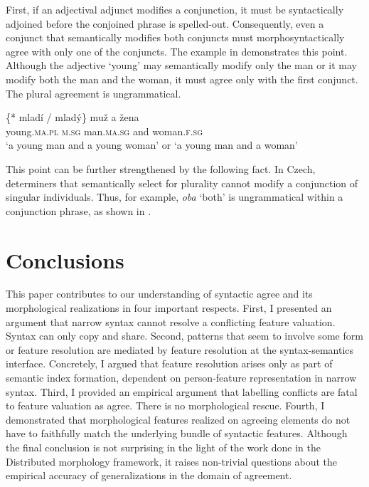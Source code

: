 \documentclass[output=paper,
modfonts
newtxmath,
hidelinks
]{langscibook}
\begin{document}
First, if an adjectival adjunct modifies a conjunction, it must be syntactically adjoined before the conjoined phrase is spelled-out. Consequently, even a conjunct that semantically modifies both conjuncts must morphosyntactically agree with only one of the conjuncts. The example in  demonstrates this point. Although the adjective `young' may semantically modify only the man or it may modify both the man and the woman, it must agree only with the first conjunct. The plural agreement is ungrammatical.


\ea\gll \{*\hspace{-2pt} mladí / mladý\} muž a žena\label{adjunct}\\
{} young.\textsc{ma.pl} {} \textsc{m.sg} man.\textsc{ma.sg} and woman.\textsc{f.sg}\\
\glt `a young man and a young woman' or `a young man and a woman'
\z

\noindent This point can be further strengthened by the following fact. In Czech, determiners that semantically select for plurality cannot modify a conjunction of singular individuals. Thus, for example, \textit{oba} `both' is ungrammatical within a conjunction phrase, as shown in .

\z

\section{Conclusions}

This paper contributes to our understanding of syntactic agree and its morphological realizations in four important respects. First, I presented an argument that narrow syntax cannot resolve a conflicting feature valuation. Syntax can only copy and share. Second, patterns that seem to involve some form or feature resolution are mediated by feature resolution at the syntax-semantics interface. Concretely, I argued that feature resolution arises only as part of semantic index formation, dependent on person-feature representation in narrow syntax. Third, I provided an empirical argument that labelling conflicts are fatal to feature valuation as agree. There is no morphological rescue. Fourth, I demonstrated that morphological features realized on agreeing elements do not have to faithfully match the underlying bundle of syntactic features. Although the final conclusion is not surprising in the light of the work done in the Distributed morphology framework, it raises non-trivial questions about the empirical accuracy of generalizations in the domain of agreement. 
\end{document}
